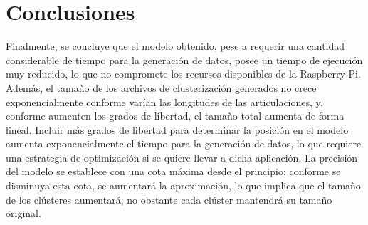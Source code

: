 \section{Conclusiones}

Finalmente, se concluye que el modelo obtenido, pese a requerir una cantidad considerable de tiempo para la generación de datos, posee un tiempo de ejecución muy reducido, lo que no compromete los recursos disponibles de la Raspberry Pi. Además, el tamaño de los archivos de clusterización generados no crece exponencialmente conforme varían las longitudes de las articulaciones, y, conforme aumenten los grados de libertad, el tamaño total aumenta de forma lineal. Incluir más grados de libertad para determinar la posición en el modelo aumenta exponencialmente el tiempo para la generación de datos, lo que requiere una estrategia de optimización si se quiere llevar a dicha aplicación. La precisión del modelo se establece con una cota máxima desde el principio; conforme se disminuya esta cota, se aumentará la aproximación, lo que implica que el tamaño de los clústeres aumentará; no obstante cada clúster mantendrá su tamaño original.